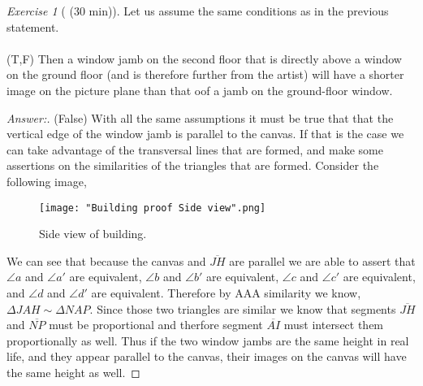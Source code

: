 \documentclass[12pt]{amsart}
\theoremstyle{remark}
\newtheorem*{exercise}{Exercise}%
\theoremstyle{mycomment}
\begin{document}
\begin{exercise}[ (30 min)] Let us assume the same conditions as in the previous statement.\\\\
(T,F)  Then a window jamb on the second floor that is directly above a window on the ground floor (and is therefore further from the artist) will have a shorter image on the picture plane than that oof a jamb on the ground-floor window.
\begin{proof}[Answer:] (False) With all the same assumptions it must be true that that the vertical edge of the window jamb is parallel to the canvas. If that is the case we can take advantage of the transversal lines that are formed, and make some assertions on the similarities of the triangles that are formed. Consider the following image,


\begin{figure}[ht]
\caption{Side view of building.}
\centering
\texttt{[image: "Building proof Side view".png]}
\end{figure}


We can see that because the canvas and $\overline{JH}$ are parallel we are able to assert that $\angle a$ and $\angle a'$ are equivalent, $\angle b$ and $\angle b'$ are equivalent, $\angle c$ and $\angle c'$ are equivalent, and $\angle d$ and $\angle d'$ are equivalent. Therefore by AAA similarity we know, $\Delta JAH \sim \Delta NAP$. Since those two triangles are similar we know that segments $\overline{JH}$ and $\overline{NP}$ must be proportional and therfore segment $\overline{AI}$ must intersect them proportionally as well. Thus if the two window jambs are the same height in real life, and they appear parallel to the canvas, their images on the canvas will have the same height as well. 
\end{proof}
\end{exercise}


 
\end{document}

